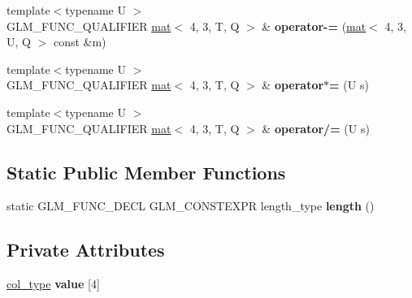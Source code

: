 \begin{DoxyCompactItemize}
\mbox{\label{structglm_1_1mat_3_014_00_013_00_01T_00_01Q_01_4_a6c96adf119836504e44d2050869b7d8b}} 
{\footnotesize template$<$typename U $>$ }\\G\+L\+M\+\_\+\+F\+U\+N\+C\+\_\+\+Q\+U\+A\+L\+I\+F\+I\+ER \hyperlink{structglm_1_1mat}{mat}$<$ 4, 3, T, Q $>$ \& {\bfseries operator-\/=} (\hyperlink{structglm_1_1mat}{mat}$<$ 4, 3, U, Q $>$ const \&m)
\item 
\mbox{\label{structglm_1_1mat_3_014_00_013_00_01T_00_01Q_01_4_a4b3846610c3a67636b062fdeeee42243}} 
{\footnotesize template$<$typename U $>$ }\\G\+L\+M\+\_\+\+F\+U\+N\+C\+\_\+\+Q\+U\+A\+L\+I\+F\+I\+ER \hyperlink{structglm_1_1mat}{mat}$<$ 4, 3, T, Q $>$ \& {\bfseries operator$\ast$=} (U s)
\item 
\mbox{\label{structglm_1_1mat_3_014_00_013_00_01T_00_01Q_01_4_ac85c9c099e9e7c43a4f04ae0c39582bd}} 
{\footnotesize template$<$typename U $>$ }\\G\+L\+M\+\_\+\+F\+U\+N\+C\+\_\+\+Q\+U\+A\+L\+I\+F\+I\+ER \hyperlink{structglm_1_1mat}{mat}$<$ 4, 3, T, Q $>$ \& {\bfseries operator/=} (U s)
\end{DoxyCompactItemize}
\subsection*{Static Public Member Functions}
\begin{DoxyCompactItemize}
\item 
\mbox{\label{structglm_1_1mat_3_014_00_013_00_01T_00_01Q_01_4_a3f28efbb3e6be20443f461a6261ae631}} 
static G\+L\+M\+\_\+\+F\+U\+N\+C\+\_\+\+D\+E\+CL G\+L\+M\+\_\+\+C\+O\+N\+S\+T\+E\+X\+PR length\+\_\+type {\bfseries length} ()
\end{DoxyCompactItemize}
\subsection*{Private Attributes}
\begin{DoxyCompactItemize}
\item 
\mbox{\label{structglm_1_1mat_3_014_00_013_00_01T_00_01Q_01_4_ad14b8b7424e4b4cadee7d85cedc61b7a}} 
\hyperlink{structglm_1_1vec_3_013_00_01T_00_01Q_01_4}{col\+\_\+type} {\bfseries value} \mbox{[}4\mbox{]}
\end{DoxyCompactItemize}


